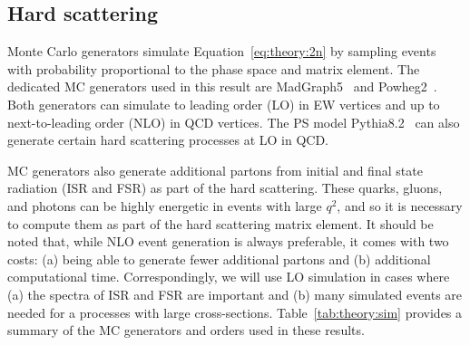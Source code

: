 \subsection{Hard scattering}

Monte Carlo generators simulate Equation~\ref{eq:theory:2n} by sampling events with probability proportional to the phase space and matrix element.
The dedicated MC generators used in this result are MadGraph5~\cite{mg5,fxfx} and Powheg2~\cite{powheg}.
Both generators can simulate to leading order (LO) in EW vertices and up to next-to-leading order (NLO) in QCD vertices.
The PS model Pythia8.2~\cite{pythia} can also generate certain hard scattering processes at LO in QCD.

MC generators also generate additional partons from initial and final state radiation ({ISR} and {FSR}) as part of the hard scattering.
These quarks, gluons, and photons can be highly energetic in events with large ${q^2}$, and so it is necessary to compute them as part of the hard scattering matrix element.  
It should be noted that, while NLO event generation is always preferable, it comes with two costs: (a) being able to generate fewer additional partons and (b) additional computational time.
Correspondingly, we will use LO simulation in cases where (a) the spectra of ISR and FSR are important and (b) many simulated events are needed for a processes with large cross-sections.
Table~\ref{tab:theory:sim} provides a summary of the MC generators and orders used in these results.


